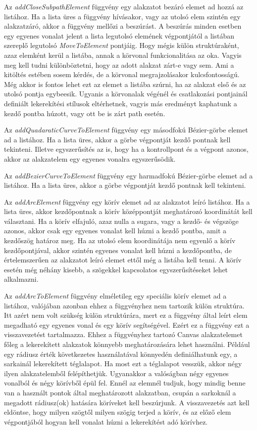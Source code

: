 \documentclass[12pt]{report}
\theoremstyle{definition}
\newcommand{\func}[1]{{\textsl{#1}}}
\begin{document}
Az \func{addCloseSubpathElement} függvény egy alakzatot bezáró elemet ad hozzá
az listához. Ha a lista üres a függvény hívásakor, vagy az utolsó elem szintén
egy alakzatzáró, akkor a függvény mellőzi a beszúrást. A beszúrás minden
esetben egy egyenes vonalat jelent a lista legutolsó elemének végpontjától a
listában szereplő legutolsó \func{MoveToElement} pontjáig. Hogy mégis külön
struktúraként, azaz elemként kerül a listába, annak a körvonal funkcionalitása
az oka. Vagyis meg kell tudni különböztetni, hogy az adott alakzat zárt-e vagy
sem. Ami a kitöltés estében sosem kérdés, de a körvonal megrajzolásakor
kulcsfontosságú. Még akkor is fontos lehet ezt az elemet a listába szúrni, ha
az alakzat első és az utolsó pontja egybeesik. Ugyanis a körvonalak
végénél és csatlakozási pontjainál definiált lekerekítési stílusok
eltérhetnek, vagyis más eredményt kaphatunk a kezdő pontba húzott, vagy ott be
is zárt path esetén.

Az \func{addQuadaraticCurveToElement} függvény egy másodfokú Bézier-görbe
elemet ad a listához. Ha a lista üres, akkor a görbe végpontját kezdő pontnak
kell tekinteni. Illetve egyszerűsítés az is, hogy ha a kontrollpont és a
végpont azonos, akkor az alakzatelem egy egyenes vonalra egyszerűsödik.

Az \func{addBezierCurveToElement} függvény egy harmadfokú Bézier-görbe elemet
ad a listához. Ha a lista üres, akkor a görbe végpontját kezdő pontnak kell
tekinteni.

Az \func{addArcElement} függvény egy körív elemet ad az alakzatot leíró
listához. Ha a lista üres, akkor kezdőpontnak a körív középpontját meghatározó
koordinátát kell választani. Ha a körív elfajuló, azaz nulla a sugara, vagy a
kezdő- és végszöge azonos, akkor csak egy egyenes vonalat kell húzni a kezdő
pontba, amit a kezdőszög határoz meg. Ha az utolsó elem koordinátája nem
egyenlő a körív kezdőpontjával, akkor szintén egyenes vonalat kell húzni a
kezdőpontba, de értelemszerűen az alakzatot leíró elemet ettől még a listába
kell tenni. A körív esetén még néhány kisebb, a szögekkel kapcsolatos
egyszerűsítéseket lehet alkalmazni.

Az \func{addArcToElement} függvény elméletileg egy speciális körív elemet ad a
listához, valójában azonban ehhez a függvényhez nem tartozik külön struktúra.
Itt azért nem volt szükség külön struktúrára, mert ez a függvény által leírt
elem megadható egy egyenes vonal és egy körív segítségével. Ezért ez a függvény
ezt a visszavezetést tartalmazza. Ehhez a függvényhez tartozó Canvas
alakzatelemet főleg a lekerekített alakzatok könnyebb meghatározására lehet
használni. Például egy rádiusz érték következetes használatával könnyedén
definiálhatunk egy, a sarkainál lekerekített téglalapot. Ha most ezt a
téglalapot vesszük, akkor négy ilyen alakzatelemből felépíthetjük. Ugyanakkor a
valóságban négy egyenes vonalból és négy körívből épül fel. Ennél az elemnél
tudjuk, hogy mindig benne van a használt pontok által meghatározott alakzatban,
csupán a sarkoknál a megadott rádiusz(ok) hatására köríveket kell beszúrjunk. A
visszavezetés azt kell eldöntse, hogy milyen szögtől milyen szögig terjed a
körív, és az előző elem végpontjából hogyan kell vonalat húzni a lekerekítést
adó körívhez.
\end{document}
